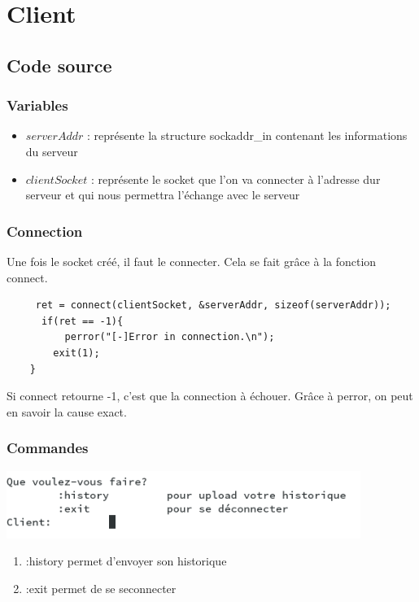 \documentclass[a4paper,11pt]{report}
\begin{document}
\chapter{Client}
\section{Code source}

\subsection{Variables}
\begin{itemize}
            \item $serverAddr$ : représente la structure sockaddr\_in contenant les informations du serveur
            \item $clientSocket$ : représente le socket que l'on va connecter à l'adresse dur serveur et qui nous permettra l'échange avec le serveur            
            
\end{itemize}
\subsection{Connection}
Une fois le socket créé, il faut le connecter. Cela se fait grâce à la fonction connect.
\begin{lstlisting} 
     ret = connect(clientSocket, &serverAddr, sizeof(serverAddr));
	  if(ret == -1){
		  perror("[-]Error in connection.\n");
		exit(1);
	}
\end{lstlisting}
	Si connect retourne -1, c'est que la connection à échouer. Grâce à perror, on peut en savoir la cause exact.
\subsection{Commandes}

\includegraphics[width=115mm]{./resources/commandes.png}

\begin{enumerate}
  \item :history permet d'envoyer son historique
  \item :exit permet de se seconnecter
\end{enumerate}
\end{document}
